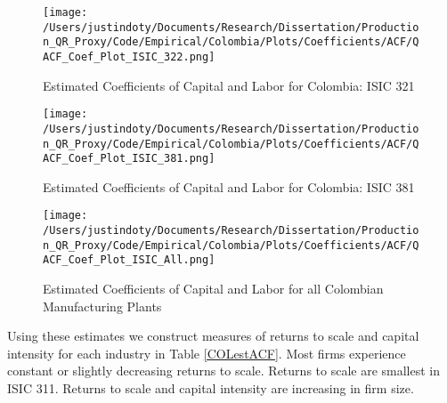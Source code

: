 \documentclass[11pt]{article}
\begin{document}
\begin{figure}[H]
\centering
\caption{Estimated Coefficients of Capital and Labor for Colombia: ISIC 321}
\texttt{[image: /Users/justindoty/Documents/Research/Dissertation/Production\_QR\_Proxy/Code/Empirical/Colombia/Plots/Coefficients/ACF/QACF\_Coef\_Plot\_ISIC\_322.png]}
\label{fig:ACFCOL321}
\end{figure}

\begin{figure}[H]
\centering
\caption{Estimated Coefficients of Capital and Labor for Colombia: ISIC 381}
\texttt{[image: /Users/justindoty/Documents/Research/Dissertation/Production\_QR\_Proxy/Code/Empirical/Colombia/Plots/Coefficients/ACF/QACF\_Coef\_Plot\_ISIC\_381.png]}
\label{fig:ACFCOL381}
\end{figure}

\begin{figure}[H]
\centering
\caption{Estimated Coefficients of Capital and Labor for all Colombian Manufacturing Plants}
\texttt{[image: /Users/justindoty/Documents/Research/Dissertation/Production\_QR\_Proxy/Code/Empirical/Colombia/Plots/Coefficients/ACF/QACF\_Coef\_Plot\_ISIC\_All.png]}
\label{fig:ACFCOLall}
\end{figure}

Using these estimates we construct measures of returns to scale and capital intensity for each industry in Table \ref{COLestACF}. Most firms experience constant or slightly decreasing returns to scale. Returns to scale are smallest in ISIC 311. Returns to scale and capital intensity are increasing in firm size.
\end{document}
